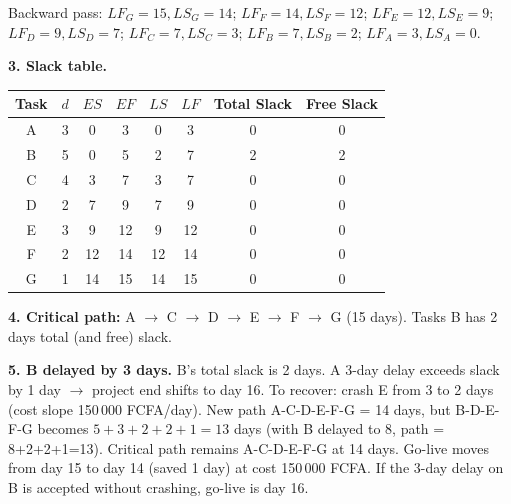 \documentclass[11pt]{article}
\begin{document}
\begin{corrige}
Backward pass:
$LF_G=15, LS_G=14$; $LF_F=14, LS_F=12$; $LF_E=12, LS_E=9$; $LF_D=9, LS_D=7$; $LF_C=7, LS_C=3$; $LF_B=7, LS_B=2$; $LF_A=3, LS_A=0$.

\textbf{3. Slack table.}
\begin{center}
\begin{tabular}{|c|c|c|c|c|c|c|c|}\hline
\rowcolor{popblueL} \textbf{Task} & $d$ & $ES$ & $EF$ & $LS$ & $LF$ & \textbf{Total Slack} & \textbf{Free Slack} \\ \hline
A & 3 & 0 & 3 & 0 & 3 & 0 & 0 \\ \hline
B & 5 & 0 & 5 & 2 & 7 & 2 & 2 \\ \hline
C & 4 & 3 & 7 & 3 & 7 & 0 & 0 \\ \hline
D & 2 & 7 & 9 & 7 & 9 & 0 & 0 \\ \hline
E & 3 & 9 & 12 & 9 & 12 & 0 & 0 \\ \hline
F & 2 & 12 & 14 & 12 & 14 & 0 & 0 \\ \hline
G & 1 & 14 & 15 & 14 & 15 & 0 & 0 \\ \hline
\end{tabular}
\end{center}

\textbf{4. Critical path:} A $\to$ C $\to$ D $\to$ E $\to$ F $\to$ G (15 days). Tasks B has 2 days total (and free) slack.

\textbf{5. B delayed by 3 days.} B's total slack is 2 days. A 3-day delay exceeds slack by 1 day $\to$ project end shifts to day 16. To recover: crash E from 3 to 2 days (cost slope 150\,000 FCFA/day). New path A-C-D-E-F-G = 14 days, but B-D-E-F-G becomes $5+3+2+2+1=13$ days (with B delayed to 8, path = 8+2+2+1=13). Critical path remains A-C-D-E-F-G at 14 days. Go-live moves from day 15 to day 14 (saved 1 day) at cost 150\,000 FCFA. If the 3-day delay on B is accepted without crashing, go-live is day 16.
\end{corrige}
\end{document}
